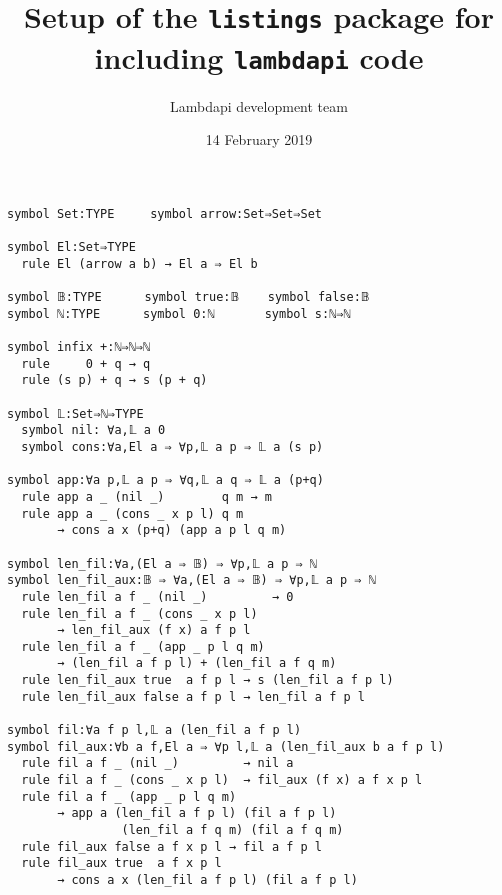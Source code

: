 \documentclass{article}
\title{Setup of the {\tt listings} package for including {\tt lambdapi} code}
\author{Lambdapi development team}
\date{14 February 2019}
\begin{document}
\maketitle

\small
\begin{lstlisting}[mathescape=true]
symbol Set:TYPE     symbol arrow:Set⇒Set⇒Set

symbol El:Set⇒TYPE
  rule El (arrow a b) → El a ⇒ El b

symbol 𝔹:TYPE      symbol true:𝔹    symbol false:𝔹
symbol ℕ:TYPE      symbol 0:ℕ       symbol s:ℕ⇒ℕ

symbol infix +:ℕ⇒ℕ⇒ℕ
  rule     0 + q → q
  rule (s p) + q → s (p + q)

symbol 𝕃:Set⇒ℕ⇒TYPE
  symbol nil: ∀a,𝕃 a 0
  symbol cons:∀a,El a ⇒ ∀p,𝕃 a p ⇒ 𝕃 a (s p)

symbol app:∀a p,𝕃 a p ⇒ ∀q,𝕃 a q ⇒ 𝕃 a (p+q)
  rule app a _ (nil _)        q m → m
  rule app a _ (cons _ x p l) q m
       → cons a x (p+q) (app a p l q m)

symbol len_fil:∀a,(El a ⇒ 𝔹) ⇒ ∀p,𝕃 a p ⇒ ℕ
symbol len_fil_aux:𝔹 ⇒ ∀a,(El a ⇒ 𝔹) ⇒ ∀p,𝕃 a p ⇒ ℕ
  rule len_fil a f _ (nil _)         → 0
  rule len_fil a f _ (cons _ x p l)
       → len_fil_aux (f x) a f p l
  rule len_fil a f _ (app _ p l q m)
       → (len_fil a f p l) + (len_fil a f q m)
  rule len_fil_aux true  a f p l → s (len_fil a f p l)
  rule len_fil_aux false a f p l → len_fil a f p l

symbol fil:∀a f p l,𝕃 a (len_fil a f p l)
symbol fil_aux:∀b a f,El a ⇒ ∀p l,𝕃 a (len_fil_aux b a f p l)
  rule fil a f _ (nil _)         → nil a
  rule fil a f _ (cons _ x p l)  → fil_aux (f x) a f x p l
  rule fil a f _ (app _ p l q m)
       → app a (len_fil a f p l) (fil a f p l)
                (len_fil a f q m) (fil a f q m)
  rule fil_aux false a f x p l → fil a f p l
  rule fil_aux true  a f x p l
       → cons a x (len_fil a f p l) (fil a f p l)
\end{lstlisting}
\end{document}
